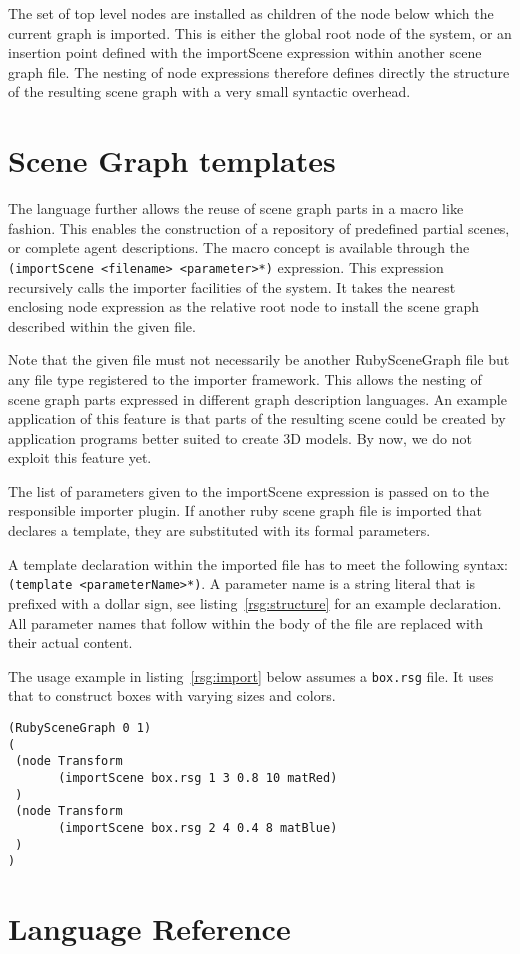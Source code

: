 The set of top level nodes are installed as children of the node below
which the current graph is imported. This is either the global root
node of the system, or an insertion point defined with the importScene
expression within another scene graph file. The nesting of node
expressions therefore defines directly the structure of the resulting
scene graph with a very small syntactic overhead.

\section{Scene Graph templates}
\label{subsec:template}

The language further allows the reuse of scene graph parts in a macro
like fashion. This enables the construction of a repository of
predefined partial scenes, or complete agent descriptions. The macro
concept is available through the \texttt{(importScene <filename>
<parameter>*)} expression. This expression recursively calls the
importer facilities of the system. It takes the nearest enclosing node
expression as the relative root node to install the scene graph
described within the given file.

Note that the given file must not necessarily be another
RubySceneGraph file but any file type registered to the importer
framework. This allows the nesting of scene graph parts expressed in
different graph description languages. An example application of this
feature is that parts of the resulting scene could be created by
application programs better suited to create 3D models. By now, we do
not exploit this feature yet.

The list of parameters given to the importScene expression is passed
on to the responsible importer plugin. If another ruby scene graph
file is imported that declares a template, they are substituted with
its formal parameters.

A template declaration within the imported file has to meet the
following syntax: \texttt{(template <parameterName>*)}. A parameter
name is a string literal that is prefixed with a dollar sign, see
listing~\ref{rsg:structure} for an example declaration. All parameter
names that follow within the body of the file are replaced with their
actual content.

The usage example in listing~\ref{rsg:import} below assumes a
\texttt{box.rsg} file. It uses that to construct boxes with varying
sizes and colors.

\begin{lstlisting}[caption={importScene example}, label=rsg:import]
(RubySceneGraph 0 1)
(
 (node Transform 
       (importScene box.rsg 1 3 0.8 10 matRed)
 )
 (node Transform
       (importScene box.rsg 2 4 0.4 8 matBlue)
 )
)
\end{lstlisting}


\section{Language Reference}
 

